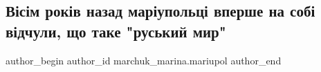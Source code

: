  
 
 
 
 

\subsection{Вісім років назад маріупольці вперше на собі відчули, що таке "руський мир"}
\label{sec:24_01_2023.fb.marchuk_marina.mariupol.1.v_s_m_rok_v_nazad_ma}

\ifcmt
 author_begin
   author_id marchuk_marina.mariupol
 author_end
\fi
